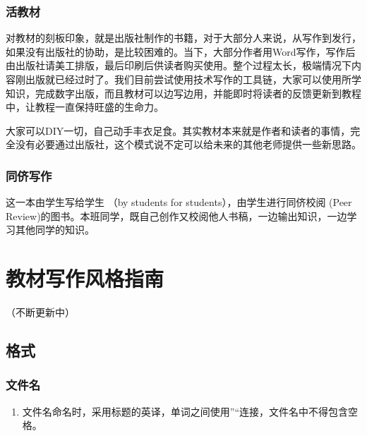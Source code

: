 \documentclass[letterpaper,10pt,english]{sphinxmanual}
\begin{document}
\subsection{活教材}
\label{\detokenize{capstone-project/book-authoring:id10}}
\sphinxAtStartPar
对教材的刻板印象，就是出版社制作的书籍，对于大部分人来说，从写作到发行，如果没有出版社的协助，是比较困难的。当下，大部分作者用Word写作，写作后由出版社请美工排版，最后印刷后供读者购买使用。整个过程太长，极端情况下内容刚出版就已经过时了。我们目前尝试使用技术写作的工具链，大家可以使用所学知识，完成数字出版，而且教材可以边写边用，并能即时将读者的反馈更新到教程中，让教程一直保持旺盛的生命力。

\sphinxAtStartPar
大家可以DIY一切，自己动手丰衣足食。其实教材本来就是作者和读者的事情，完全没有必要通过出版社，这个模式说不定可以给未来的其他老师提供一些新思路。


\subsection{同侪写作}
\label{\detokenize{capstone-project/book-authoring:id11}}
\sphinxAtStartPar
这一本由学生写给学生 （by students for students），由学生进行同侪校阅 (Peer Review)的图书。本班同学，既自己创作又校阅他人书稿，一边输出知识，一边学习其他同学的知识。

\sphinxstepscope


\chapter{教材写作风格指南}
\label{\detokenize{about/style:id1}}\label{\detokenize{about/style::doc}}
\sphinxAtStartPar
（不断更新中）


\section{格式}
\label{\detokenize{about/style:id2}}

\subsection{文件名}
\label{\detokenize{about/style:id3}}\begin{enumerate}
%
\item {} 
\sphinxAtStartPar
文件名命名时，采用标题的英译，单词之间使用”\sphinxhyphen{}“连接，文件名中不得包含空格。
\begin{quote}
\end{quote}

\end{enumerate}
\end{document}

